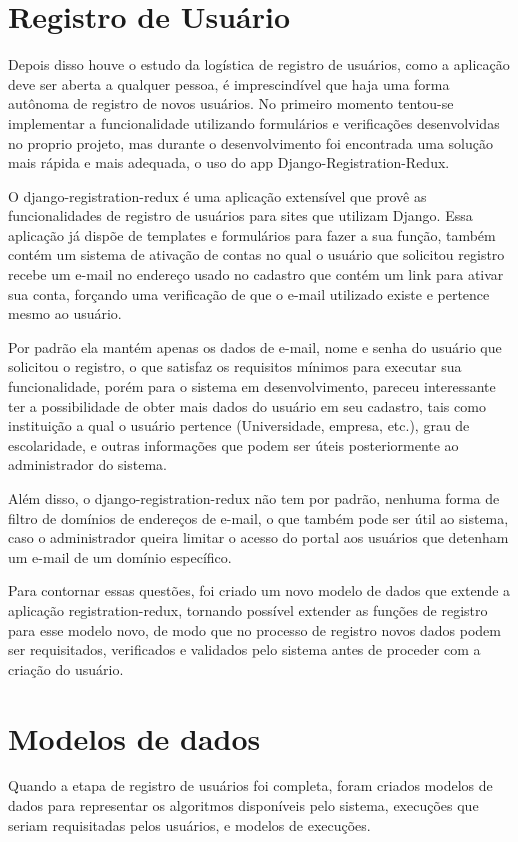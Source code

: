 \documentclass[tg]{mdtufsm}
\begin{document}
\section{Registro de Usuário}
Depois disso houve o estudo da logística de registro de usuários, como a aplicação deve ser aberta a qualquer pessoa, é imprescindível que haja uma forma autônoma de registro de novos usuários. No primeiro momento tentou-se implementar a funcionalidade utilizando formulários e verificações desenvolvidas no proprio projeto, mas durante o desenvolvimento foi encontrada uma solução mais rápida e mais adequada, o uso do app Django-Registration-Redux.

O django-registration-redux é uma aplicação extensível que provê as funcionalidades de registro de usuários para sites que utilizam Django. Essa aplicação já dispõe de templates e formulários para fazer a sua função, também contém um sistema de ativação de contas no qual o usuário que solicitou registro recebe um e-mail no endereço usado no cadastro que contém um link para ativar sua conta, forçando uma verificação de que o e-mail utilizado existe e pertence mesmo ao usuário.

 Por padrão ela mantém apenas os dados de e-mail, nome e senha do usuário que solicitou o registro, o que satisfaz os requisitos mínimos para executar sua funcionalidade, porém para o sistema em desenvolvimento, pareceu interessante ter a possibilidade de obter mais dados do usuário em seu cadastro, tais como instituição a qual o usuário pertence (Universidade, empresa, etc.), grau de escolaridade, e outras informações que podem ser úteis posteriormente ao administrador do sistema.

Além disso, o django-registration-redux não tem por padrão, nenhuma forma de filtro de domínios de endereços de e-mail, o que também pode ser útil ao sistema, caso o administrador queira limitar o acesso do portal aos usuários que detenham um e-mail de um domínio específico.

Para contornar essas questões, foi criado um novo modelo de dados que extende a aplicação registration-redux, tornando possível extender as funções de registro para esse modelo novo, de modo que no processo de registro novos dados podem ser requisitados, verificados e validados pelo sistema antes de proceder com a criação do usuário.



\section{Modelos de dados}
Quando a etapa de registro de usuários foi completa, foram criados modelos de dados para representar os algoritmos disponíveis pelo sistema, execuções que seriam requisitadas pelos usuários, e modelos de execuções.
\end{document}
